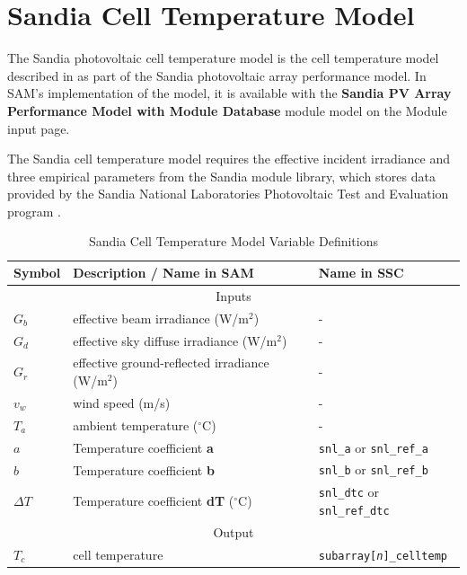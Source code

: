 \documentclass[12pt,letterpaper]{article}
\begin{document}
\section{Sandia Cell Temperature Model}\label{sec-tcsandia}

The Sandia photovoltaic cell temperature model is the cell temperature model described in \citet{king2004} as part of the Sandia photovoltaic array performance model. In SAM's implementation of the model, it is available with the \textbf{Sandia PV Array Performance Model with Module Database} module model on the Module input page.

The Sandia cell temperature model requires the effective incident irradiance and three empirical parameters from the Sandia module library, which stores data provided by the Sandia National Laboratories Photovoltaic Test and Evaluation program \citep{sandia-testeval}.

\begin{table}
\begin{center}
\caption{Sandia Cell Temperature Model Variable Definitions}
\begin{tabular}{lll}
\midrule
Symbol & Description / \textbf{Name in SAM} & Name in SSC \\
\midrule
\multicolumn{3}{c}{Inputs}\\
$G_b$ & effective beam irradiance (W/m$^2$)& - \\
$G_d$ & effective sky diffuse irradiance (W/m$^2$) & - \\
$G_r$ & effective ground-reflected irradiance (W/m$^2$) & - \\
$v_{w}$ & wind speed (m/s) & - \\
$T_{a}$ & ambient temperature ($^\circ$C) & - \\
$a$ & Temperature coefficient \textbf{a} & \texttt{snl\_a} or \texttt{snl\_ref\_a}\\
$b$ &  Temperature coefficient \textbf{b} & \texttt{snl\_b} or \texttt{snl\_ref\_b}\\
$\Delta T$ & Temperature coefficient \textbf{dT} ($^\circ$C) & \texttt{snl\_dtc} or \texttt{snl\_ref\_dtc} \\
\midrule
\multicolumn{3}{c}{Output}\\
$T_c$ & cell temperature & \texttt{subarray[\textit{n}]\_celltemp} \\
\hline
\end{tabular}
\label{tab-tempsandia}
\end{center}
\end{table}
\end{document}
